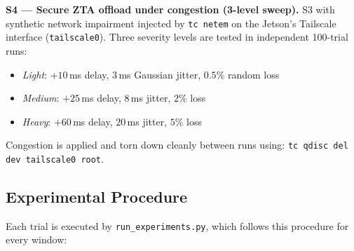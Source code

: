 \documentclass[10pt,twocolumn]{article}
\begin{document}
\textbf{S4 — Secure ZTA offload under congestion (3-level sweep).}
S3 with synthetic network impairment injected by \texttt{tc netem} on the
Jetson's Tailscale interface (\texttt{tailscale0}).  Three severity levels
are tested in independent 100-trial runs:
\begin{itemize}[leftmargin=1.5em,noitemsep]
  \item \emph{Light}:  $+10$\,ms delay, $3$\,ms Gaussian jitter, $0.5$\% random loss
  \item \emph{Medium}: $+25$\,ms delay, $8$\,ms jitter, $2$\% loss
  \item \emph{Heavy}:  $+60$\,ms delay, $20$\,ms jitter, $5$\% loss
\end{itemize}
Congestion is applied and torn down cleanly between runs using:
\texttt{tc qdisc del dev tailscale0 root}.

\subsection{Experimental Procedure}

Each trial is executed by \texttt{run\_experiments.py}, which follows
this procedure for every window:
\end{document}
